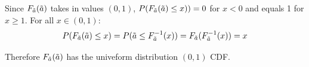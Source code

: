\documentclass[12pt,twoside]{article}
\begin{document}
\begin{enumerate}
\begin{enumerate}
Since $F_{\tilde{ a }}(\tilde{ a })$ takes in values $(0,1)$, $P(F_{\tilde{ a }}(\tilde{ a }) \leq x)) = 0$ for $x <0$ and equals 1 for $x\geq 1$. For all $x \in (0,1)$:
$$
    P(F_{\tilde{ a }}(\tilde{ a }) \leq x) = P(\tilde{ a } \leq F_{\tilde{ a }}^{-1}(x)) = F_{\tilde{ a }}(F_{\tilde{ a }}^{-1}(x)) =x $$ 

Therefore $F_{\tilde{ a }}(\tilde{ a })$ has the univeform distribution $(0,1)$ CDF.
\end{enumerate}

\end{enumerate}
\end{document}

